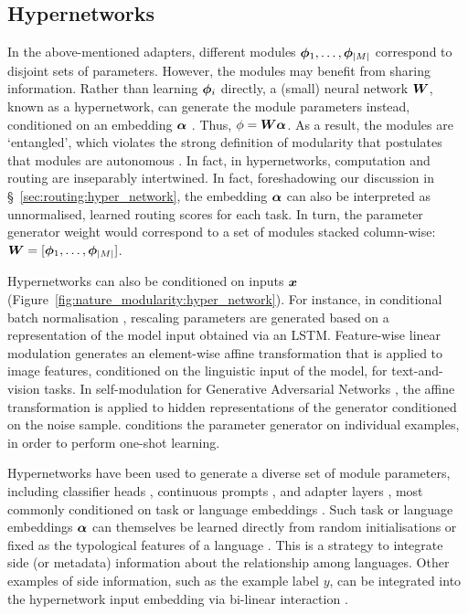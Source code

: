 \documentclass[10pt]{article} %
\begin{document}
 
 
\subsection{Hypernetworks}
\label{sec:computation_function:hyper_network}

In the above-mentioned adapters, different modules ${\bm{\phi}}_1, \ldots, {\bm{\phi}}_{|M|}$ correspond to disjoint sets of parameters. However, the modules may benefit from sharing information. Rather than learning ${\bm{\phi}}_i$ directly, a (small) neural network ${\bm{W}}$, known as a hypernetwork, can generate the module parameters instead, conditioned on an embedding ${\bm{\alpha}}$ \citep{Ha2017HyperNetworks,platanios-etal-2018-contextual}. Thus, $\phi = {\bm{W}}{\bm{\alpha}}$. As a result, the modules are `entangled', which violates the strong definition of modularity that postulates that modules are autonomous \citep{goyal2019recurrent}. In fact, in hypernetworks, computation and routing are inseparably intertwined. In fact, foreshadowing our discussion in \S~\ref{sec:routing:hyper_network}, the embedding ${\bm{\alpha}}$ can also be interpreted as unnormalised, learned routing scores for each task. In turn, the parameter generator weight would correspond to a set of modules stacked column-wise: ${\bm{W}} = [{\bm{\phi}}_1, \dots, {\bm{\phi}}_{|M|}]$.

Hypernetworks can also be conditioned on inputs ${\bm{x}}$ (Figure~\ref{fig:nature_modularity:hyper_network}). For instance, in conditional batch normalisation \citep{de2017modulating}, rescaling parameters are generated based on a representation of the model input obtained via an LSTM. Feature-wise linear modulation \citep[FiLM;][]{Perez2018} generates an element-wise affine transformation that is applied to image features, conditioned on the linguistic input of the model, for text-and-vision tasks. In self-modulation for Generative Adversarial Networks \citep{Chen2019}, the affine transformation is applied to hidden representations of the generator conditioned on the noise sample.  \citet{Bertinetto2016Learning} conditions the parameter generator on individual examples, in order to perform one-shot learning.

Hypernetworks have been used to generate a diverse set of module parameters, including classifier heads \citep{ponti-etal-2021-parameter}, continuous prompts \citep{he2022hyperprompt}, and adapter layers \citep{Ustun2020,Ansell2021MADG,mahabadi2021parameter}, most commonly conditioned on task \citep{mahabadi2021parameter} or language embeddings \citep{Ustun2020,Baziotis2022MultilingualMTHyperAdapter}. Such task or language embeddings ${\bm{\alpha}}$ can themselves be learned directly from random initialisations or fixed as the typological features of a language \citep{Ustun2020,Ansell2021MADG}. This is a strategy to integrate side (or metadata) information about the relationship among languages. Other examples of side information, such as the example label $y$, can be integrated into the hypernetwork input embedding via bi-linear interaction \citep{Chen2019}.
\end{document}
